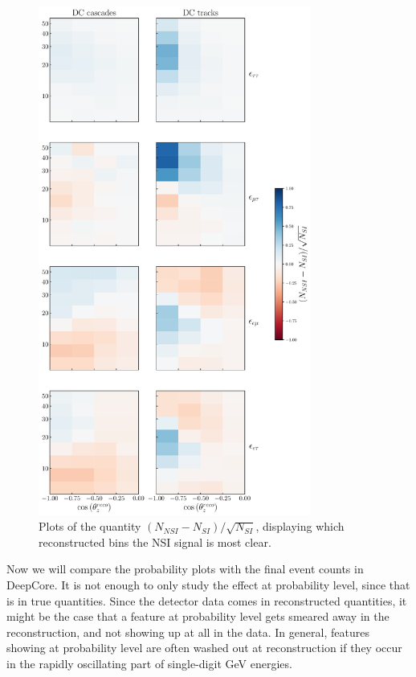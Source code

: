 \begin{figure}
    \begin{center}
        \includegraphics[width=0.8\textwidth]{figures/DC_event_pulls.pdf}
        \caption{Plots of the quantity $(N_{NSI} - N_{SI})/\sqrt{N_{SI}}$, displaying which 
        reconstructed bins the NSI signal is most clear.}
        \label{fig:event_pulls}
    \end{center}
\end{figure}

Now we will compare the probability plots with the final event counts in DeepCore. It is not enough to only study the effect at probability level, since that is in true quantities. Since the detector data comes in reconstructed quantities, it might be the case that a feature at probability level gets smeared away in the reconstruction, and not showing up at all in the data. In general, features showing at probability level are often washed out at reconstruction if they occur in the rapidly oscillating part of single-digit \si{\GeV} energies. 

